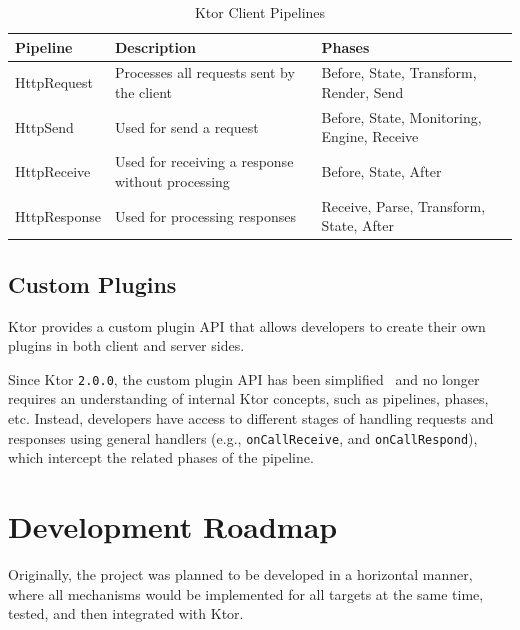 \begin{table}[!htb]
    \centering
    \caption{Ktor Client Pipelines}
    \label{tab:ktor-client-pipelines}
    \vspace{0.3cm}
    \begin{tabular}{|l|p{6cm}|p{5cm}|p{5cm}|}
        \hline
        \textbf{Pipeline} & \textbf{Description}                             & \textbf{Phases}                            \\ \hline
        HttpRequest       & Processes all requests sent by the client        & Before, State, Transform, Render, Send     \\ \hline
        HttpSend          & Used for send a request                          & Before, State, Monitoring, Engine, Receive \\ \hline
        HttpReceive       & Used for receiving a response without processing & Before, State, After                       \\ \hline
        HttpResponse      & Used for processing responses                    & Receive, Parse, Transform, State, After    \\ \hline
    \end{tabular}
\end{table}

\subsection{Custom Plugins}\label{subsec:custom-plugins}

Ktor provides a custom plugin API that allows developers to create their own plugins in both client and server sides.

Since Ktor \texttt{2.0.0}, the custom plugin API has been simplified~\cite{ktor-server-custom-plugins, ktor-client-custom-plugins} and no longer requires an understanding of internal Ktor concepts, such as pipelines, phases, etc.
Instead, developers have access to different stages of handling requests and responses using general handlers (e.g., \texttt{onCallReceive}, and \texttt{onCallRespond}), which intercept the related phases of the pipeline.


\section{Development Roadmap}\label{sec:development-roadmap}

Originally, the project was planned to be developed in a horizontal manner, where all mechanisms would be implemented for all targets at the same time, tested, and then integrated with Ktor.

